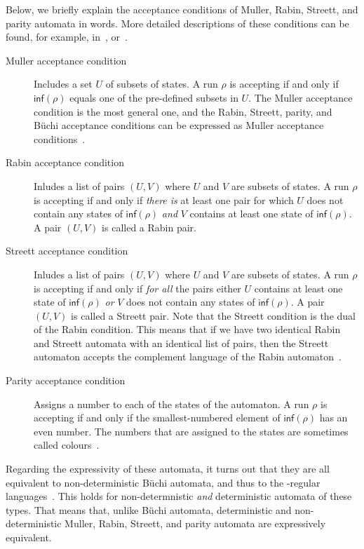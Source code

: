 Below, we briefly explain the acceptance conditions of Muller, Rabin, Streett, and parity automata in words. More detailed descriptions of these conditions can be found, for example, in~\cite{1998_loeding_msc}, or~\cite{2014_wilke}.

{
\begin{description}
\item[Muller acceptance condition]
Includes a set $U$ of subsets of states. A run $\rho$ is accepting if and only if $\textsf{inf}(\rho)$ equals one of the pre-defined subsets in $U$. The Muller acceptance condition is the most general one, and the Rabin, Streett, parity, and Büchi acceptance conditions can be expressed as Muller acceptance conditions~\cite{1998_loeding_msc,2014_wilke}.

\item[Rabin acceptance condition]
Inludes a list of pairs $(U, V)$ where $U$ and $V$ are subsets of states. A run $\rho$ is accepting if and only if \textit{there is} at least one pair for which $U$ does not contain any states of $\textsf{inf}(\rho)$ \textit{and} $V$ contains at least one state of $\textsf{inf}(\rho)$. A pair $(U, V)$ is called a Rabin pair.

\item[Streett acceptance condition]
Inludes a list of pairs $(U, V)$ where $U$ and $V$ are subsets of states. A run $\rho$ is accepting if and only if \textit{for all} the pairs either $U$ contains at least one state of $\textsf{inf}(\rho)$ \textit{or} $V$ does not contain any states of $\textsf{inf}(\rho)$. A pair $(U, V)$ is called a Streett pair. Note that the Streett condition is the dual of the Rabin condition. This means that if we have two identical Rabin and Streett automata with an identical list of pairs, then the Streett automaton accepts the complement language of the Rabin automaton~\cite{klein2005linear}.

\item[Parity acceptance condition]
Assigns a number to each of the states of the automaton. A run $\rho$ is accepting if and only if the smallest-numbered element of $\textsf{inf}(\rho)$ has an even number. The numbers that are assigned to the states are sometimes called colours~\cite{1999_loeding}.
\end{description}}

Regarding the expressivity of these automata, it turns out that they are all equivalent to non-deterministic Büchi automata, and thus to the \om-regular languages~\cite{2014_wilke}. This holds for non-determnistic \textit{and} deterministic automata of these types. That means that, unlike Büchi automata, deterministic and non-deterministic Muller, Rabin, Streett, and parity automata are expressively equivalent.

